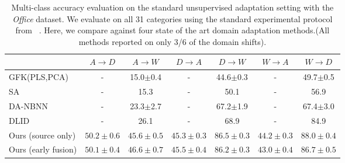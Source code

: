 \begin{table*}
  \setlength{\tabcolsep}{4pt}
  \small
\centering
\begin{tabular}{lcccccc}
\toprule
                     & $A \rightarrow D$   & $A \rightarrow W$   & $D \rightarrow A$   & $D \rightarrow W$   & $W \rightarrow A$   & $W \rightarrow D$   \\
\midrule
GFK(PLS,PCA)~\cite{gong-cvpr12} & - & 15.0$\pm$0.4 & - & 44.6$\pm$0.3 & - & 49.7$\pm$0.5\\
SA~\cite{fernando-iccv13} & - & 15.3 & - & 50.1& - & 56.9\\
DA-NBNN~\cite{da-nbnn} & - & 23.3$\pm$2.7 & - & 67.2$\pm$1.9 & - & 67.4$\pm$3.0\\
DLID~\cite{ref:dlid} & - & 26.1 & - & 68.9 & - & 84.9\\
\midrule
 Ours (source only)   & $\bm{50.2 \pm 0.6}$     & $45.6 \pm 0.5$     & $45.3 \pm 0.3$     & $\bm{86.5 \pm 0.3}$     & $\bm{44.2 \pm 0.3}$     & $\bm{88.0 \pm 0.4}$     \\
Ours (early fusion)   & $50.1 \pm 0.4$     & $\bm{46.6 \pm 0.7}$     & $\bm{45.5 \pm 0.4}$     & $86.2 \pm 0.3$     & $43.0 \pm 0.4$     & $86.7 \pm 0.5$     \\
\bottomrule
\end{tabular}

\caption{Multi-class accuracy evaluation on the standard unsupervised adaptation setting with the \emph{Office} dataset. We evaluate on all 31 categories using the standard experimental protocol from ~\cite{gong-cvpr12}. Here, we compare against four state of the art domain adaptation methods.(All methods reported on only 3/6 of the domain shifts).}
\label{table:full-unsuper}
\end{table*}

